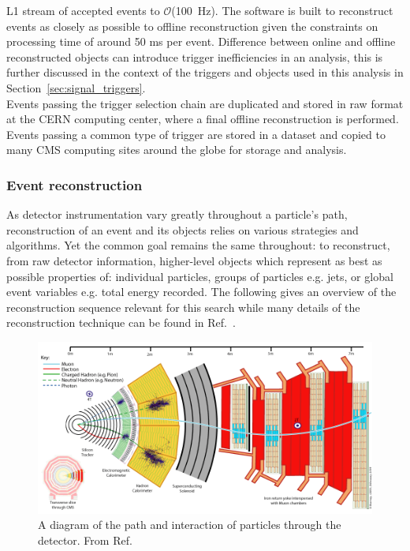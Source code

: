 L1 stream of accepted events to $\mathcal{O}$(100~Hz). The software is built to reconstruct
events as closely as possible to offline reconstruction given the constraints on processing time
of around 50 ms per event. Difference between online and offline reconstructed objects can 
introduce trigger inefficiencies in an analysis, this is further discussed in the 
context of the triggers and objects used in this analysis in Section~\ref{sec:signal_triggers}.\\
\indent Events passing the trigger selection chain are duplicated and stored in raw format at
the CERN computing center, where a final offline reconstruction is performed. Events passing
a common type of trigger are stored in a dataset and copied to many CMS computing sites around the
globe for storage and analysis. 
  
\subsubsection{Event reconstruction\label{sec:eventReco}}

As detector instrumentation vary greatly throughout a particle's path, reconstruction
of an event and its objects relies on various strategies and algorithms. Yet the common goal 
remains the same throughout: to reconstruct, from raw detector information,
higher-level objects which represent as best as possible properties of: individual
particles, groups of particles e.g. jets, or global event variables e.g. total energy
recorded. The following gives an overview of the reconstruction sequence relevant for this search
while many details of the reconstruction technique can be found in Ref.~\cite{Bayatian:922757,Bayatian:942733}. 

\begin{figure}[h!]
  \begin{center}
      \includegraphics[width=.9\textwidth,]{figures/CMS_Slice}
      \caption{\label{fig:cmsSlice}
      A diagram of the path and interaction of particles through the detector. From Ref.~\cite{cmsSlice}}
  \end{center}
\end{figure}


